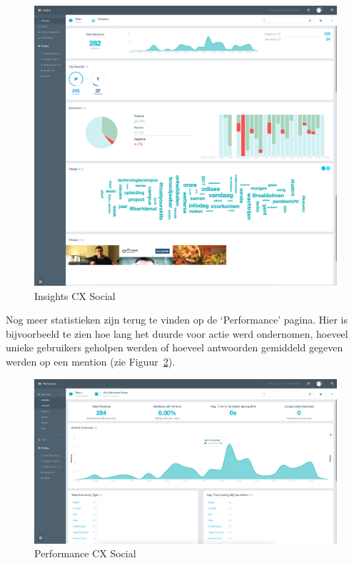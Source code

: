 \begin{figure}[H]
	\centering
	\includegraphics[width=1\textwidth]{Figuren/Insights.png}
	\caption{Insights CX Social \cite{EngagorScreenshots}} %
	\label{fig:Insights}
\end{figure} 

Nog meer statistieken zijn terug te vinden op de `Performance' pagina. Hier is bijvoorbeeld te zien hoe lang het duurde voor actie werd ondernomen, hoeveel unieke gebruikers geholpen werden of hoeveel antwoorden gemiddeld gegeven werden op een mention (zie Figuur~\ref{fig:Performance}).

\begin{figure}[H]
	\centering
	\includegraphics[width=1\textwidth]{Figuren/Performance.png}
	\caption{Performance CX Social \cite{EngagorScreenshots}} %
	\label{fig:Performance}
\end{figure} 


